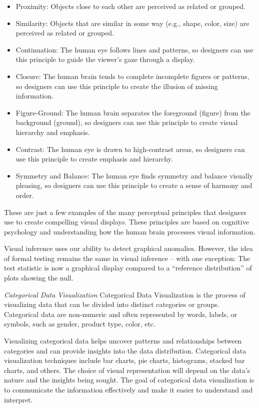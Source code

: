 \documentclass[print]{nuthesis}
\providecommand{\tightlist}{%
  \setlength{\itemsep}{0pt}\setlength{\parskip}{0pt}}
\begin{document}
\begin{itemize}
\tightlist
\item
  Proximity: Objects close to each other are perceived as related or grouped.
\item
  Similarity: Objects that are similar in some way (e.g., shape, color, size) are perceived as related or grouped.
\item
  Continuation: The human eye follows lines and patterns, so designers can use this principle to guide the viewer's gaze through a display.
\item
  Closure: The human brain tends to complete incomplete figures or patterns, so designers can use this principle to create the illusion of missing information.
\item
  Figure-Ground: The human brain separates the foreground (figure) from the background (ground), so designers can use this principle to create visual hierarchy and emphasis.
\item
  Contrast: The human eye is drawn to high-contrast areas, so designers can use this principle to create emphasis and hierarchy.
\item
  Symmetry and Balance: The human eye finds symmetry and balance visually pleasing, so designers can use this principle to create a sense of harmony and order.
\end{itemize}

These are just a few examples of the many perceptual principles that designers use to create compelling visual displays. These principles are based on cognitive psychology and understanding how the human brain processes visual information.

Visual inference uses our ability to detect graphical anomalies. However, the idea of formal testing remains the same in visual inference -- with one exception: The test statistic is now a graphical display compared to a ``reference distribution'' of plots showing the null.

\emph{Categorical Data Visualization}
Categorical Data Visualization is the process of visualizing data that can be divided into distinct categories or groups. Categorical data are non-numeric and often represented by words, labels, or symbols, such as gender, product type, color, etc.

Visualizing categorical data helps uncover patterns and relationships between categories and can provide insights into the data distribution. Categorical data visualization techniques include bar charts, pie charts, histograms, stacked bar charts, and others. The choice of visual representation will depend on the data's nature and the insights being sought. The goal of categorical data visualization is to communicate the information effectively and make it easier to understand and interpret.
\end{document}
